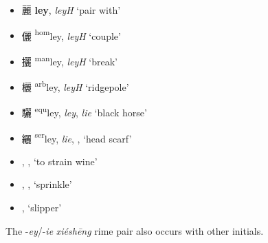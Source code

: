 \begin{itemize}
    \item {\Large{麗}}  %
    {\large{\textbf{ley}}}, 
    \textit{leyH}       %
    `pair with'

    \item {\Large{儷}}  %
    {\large{{\textsuperscript{hom}}ley}},
    \textit{leyH}       %
    `couple'

    \item {\Large{攦}}  %
    {\large{{\textsuperscript{man}}ley}},
    \textit{leyH}       %
    `break'

    \item {\Large{欐}}  %
    {\large{{\textsuperscript{arb}}ley}},
    \textit{leyH}       %
    `ridgepole'

    \item {\Large{驪}}  %
    {\large{{\textsuperscript{equ}}ley}},
    \textit{ley}, \textit{lie}   %
    `black horse'

    \item {\Large{纚}}  %
    {\large{{\textsuperscript{ser}}ley}},
    \textit{lie}, \textit{\color{gray}{ṣeaX}}, \textit{\color{gray}{ṣieX}}
    `head scarf'

\item {}  %
{},
\textit{\color{gray}{ṣie}}, \textit{\color{gray}{ṣiə}}
`to strain wine'

\item {}  %
{},
\textit{\color{gray}{ṣeaH}}, \textit{\color{gray}{ṣeaX}}  %
`sprinkle'

\item {}  %
{},
\textit{\color{gray}{ṣieX}}       %
`slipper'

\end{itemize}


The -\textit{ey}/-\textit{ie} \textit{xiéshēng} rime pair also occurs with other initials.  

